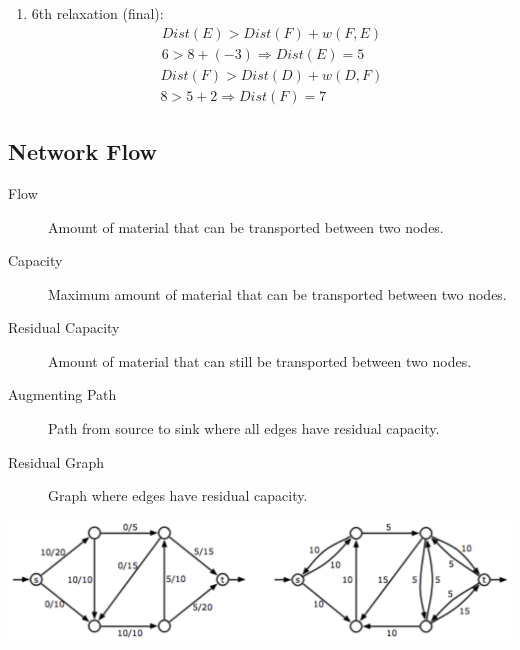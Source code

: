 \documentclass{article}
\begin{document}
\begin{multicols*}{2}
\begin{enumerate}
        \item 6th relaxation (final):
              \begin{align*}
                  Dist(E) > Dist(F) + w(F, E) \\
                  6 > 8 + (-3) \Rightarrow Dist(E) = 5
              \end{align*}
              \begin{align*}
                  Dist(F) > Dist(D) + w(D, F) \\
                  8 > 5 + 2 \Rightarrow Dist(F) = 7
              \end{align*}
    \end{enumerate}
\end{multicols*}

\begin{multicols*}{2}
    \subsection*{Network Flow}
    \begin{description}
        \item[Flow] Amount of material that can be transported between two nodes.
        \item[Capacity] Maximum amount of material that can be transported between
            two nodes.
        \item[Residual Capacity] Amount of material that can still be transported
            between two nodes.
        \item[Augmenting Path] Path from source to sink where all edges have
            residual capacity.
        \item[Residual Graph] Graph where edges have residual capacity.
    \end{description}
    \columnbreak
    \includegraphics[width=\linewidth]{residual.png}
\end{multicols*}
\end{document}
